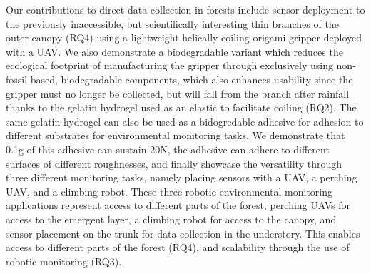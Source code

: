 
Our contributions to direct data collection in forests include  sensor deployment to the previously inaccessible, but scientifically interesting thin branches of the outer-canopy (RQ4) using a lightweight helically coiling origami gripper deployed with a UAV. We also demonstrate a biodegradable variant which reduces the ecological footprint of manufacturing the gripper through exclusively using non-fossil based, biodegradable components, which also enhances usability since the gripper must no longer be collected, but will fall from the branch after rainfall thanks to the gelatin hydrogel used as an elastic to facilitate coiling (RQ2).
The same gelatin-hydrogel can also be used as a bidogredable adhesive for adhesion to different substrates for environmental monitoring tasks. We demonstrate that 0.1g of this adhesive can sustain 20N, the adhesive can adhere to different surfaces of different roughnesses, and finally showcase the versatility through three different monitoring tasks, namely placing sensors with a UAV, a perching UAV, and a climbing robot. These three robotic environmental monitoring applications represent access to different parts of the forest, perching UAVs for access to the emergent layer, a climbing robot for access to the canopy, and sensor placement on the trunk for data collection in the understory. This enables access to different parts of the forest (RQ4), and scalability through the use of robotic monitoring (RQ3).


